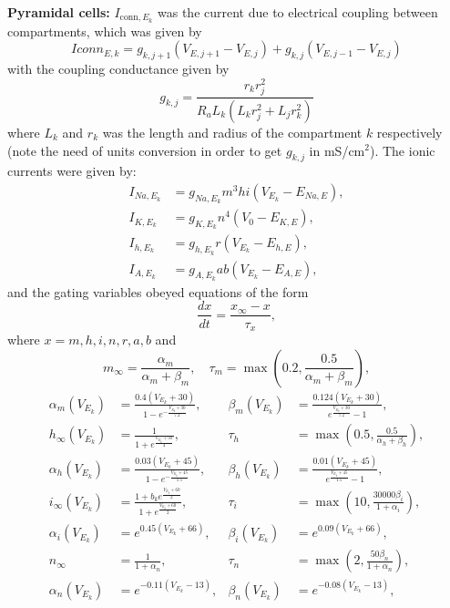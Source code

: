 \noindent
\textbf{Pyramidal cells:}
\(I_{\text{conn}, E_k}\) was the current due to electrical coupling between compartments, which was given by
\[
    Iconn_{E,k} = g_{k,j+1}(V_{E,j+1} - V_{E,j}) + g_{k,j}(V_{E,j-1} - V_{E,j})
\]
with the coupling conductance given by
\[
    g_{k,j} = \frac{r_k r_j^2}{R_a L_k (L_k r_j^2 + L_j r_k^2)}
\]
where \(L_k\) and \(r_k\) was the length and radius of the compartment \(k\)
respectively (note the need of units conversion in order to get \(g_{k,j}\) in
mS/cm\(^2\)). The ionic currents were given by:
\begin{align*}
    I_{Na,E_k} & = g_{Na,E_k} m^3 h i (V_{E_k} - E_{Na,E}) , \\
    I_{K,E_k}  & = g_{K,E_k} n^4 (V_0 - E_{K,E}) ,           \\
    I_{h,E_k}  & = g_{h,E_k} r (V_{E_k} - E_{h,E}) ,         \\
    I_{A,E_k}  & = g_{A,E_k} ab (V_{E_k} - E_{A,E}) ,
\end{align*}
and the gating variables obeyed equations of the form
\[
    \frac{dx}{dt} = \frac{x_{\infty} - x}{\tau_x},
\]
where \(x = m, h, i, n, r, a, b\) and
\[
    m_{\infty} = \frac{\alpha_m}{\alpha_m + \beta_m}, \quad \tau_m = \max\left(0.2, \frac{0.5}{\alpha_m + \beta_m}\right),
\]
\begin{align*}
    \alpha_m(V_{E_k})   & = \frac{0.4(V_{E_k} + 30)}{1 - e^{-\frac{V_{E_k} + 30}{7.2}}},               & \beta_m(V_{E_k}) & = \frac{0.124(V_{E_k} + 30)}{e^{\frac{V_{E_k} + 30}{7.2}} - 1}, \\
    h_{\infty}(V_{E_k}) & = \frac{1}{1 + e^{\frac{V_{E_k} + 50}{4}}},                                  & \tau_h           & = \max\left(0.5, \frac{0.5}{\alpha_h + \beta_h}\right),         \\
    \alpha_h(V_{E_k})   & = \frac{0.03(V_{E_k} + 45)}{1 - e^{-\frac{V_{E_k} + 45}{1.5}}},              & \beta_h(V_{E_k}) & = \frac{0.01(V_{E_k} + 45)}{e^{\frac{V_{E_k} + 45}{1.5}} - 1},  \\
    i_{\infty}(V_{E_k}) & = \frac{1 + b_k e^{\frac{V_{E_k} + 60}{2}}}{1 + e^{\frac{V_{E_k} + 60}{2}}}, & \tau_i           & = \max\left(10, \frac{30000\beta_i}{1 + \alpha_i}\right),       \\
    \alpha_i(V_{E_k})   & = e^{0.45(V_{E_k} + 66)},                                                    & \beta_i(V_{E_k}) & = e^{0.09(V_{E_k} + 66)},                                       \\
    n_{\infty}          & = \frac{1}{1 + \alpha_n},                                                    & \tau_n           & = \max\left(2, \frac{50\beta_n}{1 + \alpha_n}\right),           \\
    \alpha_n(V_{E_k})   & = e^{-0.11(V_{E_k} - 13)},                                                   & \beta_n(V_{E_k}) & = e^{-0.08(V_{E_k} - 13)},
\end{align*}
